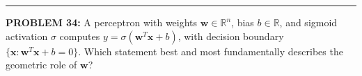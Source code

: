 \documentclass[12pt]{amsart}
\newcommand{\divider}{
  \vspace{-1em} %
  \noindent
  \raisebox{-0.15ex}{\textbullet}%
  \hspace{0.5em}%
  \rule[0.5ex]{0.95\textwidth}{1.0pt}%
  \hspace{0.5em}%
  \raisebox{-0.15ex}{\textbullet}%
  \vspace{0em} %
}
\begin{document}
%
%
%

\divider



{\bf PROBLEM 34:}
A perceptron with weights $\mathbf{w} \in \mathbb{R}^n$, bias $b \in \mathbb{R}$, and sigmoid activation $\sigma$ computes $y = \sigma(\mathbf{w}^T \mathbf{x} + b)$, with decision boundary $\{\mathbf{x} : \mathbf{w}^T \mathbf{x} + b = 0\}$.
%
Which statement best and most fundamentally describes the geometric role of $\mathbf{w}$?
\end{document}
